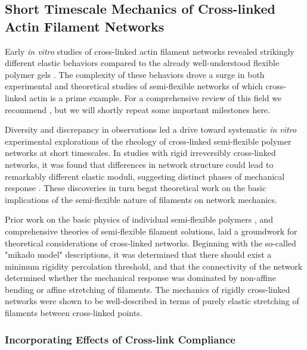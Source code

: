 \subsection{Short Timescale Mechanics of Cross-linked Actin Filament Networks}
\label{sec:semiflex}
Early {\em in vitro}  studies of cross-linked actin filament networks revealed strikingly different elastic behaviors compared to the already well-understood flexible polymer gels \cite{rheo_bench}.  The complexity of these behaviors drove a surge in both experimental and theoretical studies of semi-flexible networks of which cross-linked actin is a prime example.  For a comprehensive review of this field we recommend \cite{megareview}, but we will shortly repeat some important milestones here.

Diversity and discrepancy in observations led a drive toward systematic {\em in vitro} experimental explorations of the rheology of cross-linked semi-flexible polymer networks at short timescales.  In studies with rigid irreversibly cross-linked networks, it was found that differences in network structure could lead to remarkably different elastic moduli, suggesting distinct phases of mechanical response \cite{rheo_marge}.  These discoveries in turn begat theoretical work on the basic implications of the semi-flexible nature of filaments on network mechanics.  

Prior work on the basic physics of individual semi-flexible polymers \cite{mol_wlc,theo_doi_ed}, and comprehensive theories of semi-flexible filament solutions, \cite{theo_morse} laid a groundwork for theoretical considerations of cross-linked networks. Beginning with the so-called "mikado model" descriptions\cite{theo_hlm,theo_hlm2}, it was determined that there should exist a minimum rigidity percolation threshold, and that the connectivity of the network determined whether the mechanical response was dominated by non-affine bending or affine stretching of filaments.  The mechanics of rigidly cross-linked networks were shown to be well-described in terms of purely elastic stretching of filaments between cross-linked points\cite{theo_best}.  

\subsubsection{Incorporating Effects of Cross-link Compliance}

